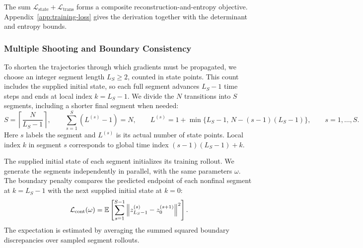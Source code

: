 The sum $\mathcal L_{\mathrm{state}}+\mathcal L_{\mathrm{trans}}$ forms a composite reconstruction-and-entropy objective. Appendix~\ref{app:training-loss} gives the derivation together with the determinant and entropy bounds.

\subsubsection{Multiple Shooting and Boundary Consistency}
To shorten the trajectories through which gradients must be propagated, we choose an integer segment length $L_S\geq2$, counted in state points. This count includes the supplied initial state, so each full segment advances $L_S-1$ time steps and ends at local index $k=L_S-1$. We divide the $N$ transitions into $S$ segments, including a shorter final segment when needed:
\begin{equation}\label{eq:segment-partition}
 S=\left\lceil\frac{N}{L_S-1}\right\rceil,\qquad
 \sum_{s=1}^S(L^{(s)}-1)=N,\qquad
 L^{(s)}=1+\min\{L_S-1,\,N-(s-1)(L_S-1)\},\qquad s=1,\ldots,S.
\end{equation}
Here $s$ labels the segment and $L^{(s)}$ is its actual number of state points. Local index $k$ in segment $s$ corresponds to global time index $(s-1)(L_S-1)+k$.

The supplied initial state of each segment initializes its training rollout. We generate the segments independently in parallel, with the same parameters $\omega$. The boundary penalty compares the predicted endpoint of each nonfinal segment at $k=L_S-1$ with the next supplied initial state at $k=0$:
\begin{equation}\label{eq:continuity-training-loss}
 \mathcal L_{\mathrm{cont}}(\omega)
 =\mathbb E
 \left[\sum_{s=1}^{S-1}\left\lVert z_{L_S-1}^{(s)}-z_0^{(s+1)}\right\rVert^2\right].
\end{equation}
The expectation is estimated by averaging the summed squared boundary discrepancies over sampled segment rollouts.

